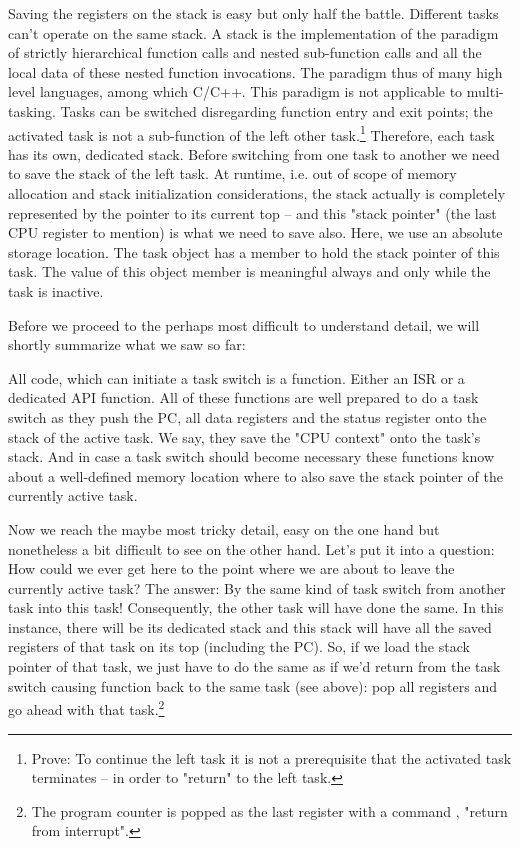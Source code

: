 Saving the registers on the stack is easy but only half the battle.
Different tasks can't operate on the same stack. A stack is the
implementation of the paradigm of strictly hierarchical function calls and
nested sub-function calls and all the local data of these nested function
invocations. The paradigm thus of many high level languages, among which
C/C++. This paradigm is not applicable to multi-tasking. Tasks can be
switched disregarding function entry and exit points; the activated task
is not a sub-function of the left other task.\footnote{Prove: To continue
the left task it is not a prerequisite that the activated task terminates
-- in order to "return" to the left task.} Therefore, each task has its
own, dedicated stack. Before switching from one task to another we need to
save the stack of the left task. At runtime, i.e. out of scope of memory
allocation and stack initialization considerations, the stack actually is
completely represented by the pointer to its current top -- and this
"stack pointer" (the last CPU register to mention) is what we need to save
also. Here, we use an absolute storage location. The task object has a
member to hold the stack pointer of this task. The value of this object
member is meaningful always and only while the task is inactive.

Before we proceed to the perhaps most difficult to understand detail, we
will shortly summarize what we saw so far:

All code, which can initiate a task switch is a function. Either an ISR or
a dedicated API function. All of these functions are well prepared to do a
task switch as they push the PC, all data registers and the status
register onto the stack of the active task. We say, they save the "CPU
context" onto the task's stack. And in case a task switch should become
necessary these functions know about a well-defined memory location where
to also save the stack pointer of the currently active task.

Now we reach the maybe most tricky detail, easy on the one hand but
nonetheless a bit difficult to see on the other hand. Let's put it into a
question: How could we ever get here to the point where we are about to
leave the currently active task? The answer: By the same kind of task
switch from another task into this task! Consequently, the other task will
have done the same. In this instance, there will be its dedicated stack
and this stack will have all the saved registers of that task on its top
(including the PC). So, if we load the stack pointer of that task, we just
have to do the same as if we'd return from the task switch causing
function back to the same task (see above): pop all registers and go
ahead with that task.\footnote{The program counter is popped as the last
register with a command , "return from interrupt".}

